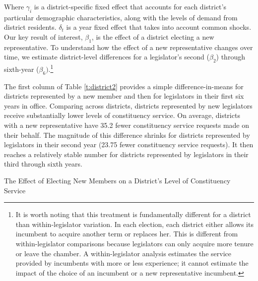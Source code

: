 \documentclass[12pt]{article}
\begin{document}
{Where $\gamma_{i}$ is a district-specific fixed effect that accounts for each district's particular demographic characteristics, along with the levels of demand from district residents. $\delta_{t}$ is a year fixed effect that takes into account common shocks. Our key result of interest, $\beta_{1}$, is the effect of a district electing a new representative. To understand how the effect of a new representative changes over time, we estimate district-level differences for a legislator's second ($\beta_{2}$) through sixth-year ($\beta_{6})$.\footnote{It is worth noting that this treatment is fundamentally different for a district than within-legislator variation. In each election, each district either allows its incumbent to acquire another term or replaces her. This is different from within-legislator comparisons because legislators can only acquire more tenure or leave the chamber. A within-legislator analysis estimates the service provided by incumbents with more or less experience; it cannot estimate the impact of the choice of an incumbent or a new representative incumbent.} %

The first column of Table \ref{t:district2} provides a simple difference-in-means for districts represented by a new member and then for legislators in their first six years in office. Comparing across districts, districts represented by new legislators receive substantially lower levels of constituency service. On average, districts with a new representative have 35.2 fewer constituency service requests made on their behalf. The magnitude of this difference shrinks for districts represented by legislators in their second year (23.75 fewer constituency service requests). It then reaches a relatively stable number for districts represented by legislators in their third through sixth years.%



\begin{table}[hbt!]
\caption{The Effect of Electing New Members on a District's Level of Constituency Service} \label{t:district2}
\begin{minipage}{\textwidth}
\begin{center}

\end{center}
\end{minipage}
\end{table}


}
\end{document}
